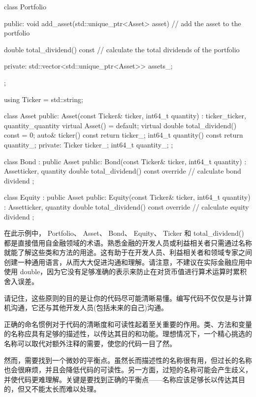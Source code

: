 \begin{cpp}
class Portfolio {
public:
    void add_asset(std::unique_ptr<Asset> asset) {
        // add the asset to the portfolio
    }

    double total_dividend() const {
        // calculate the total dividends of the portfolio
    }

private:
    std::vector<std::unique_ptr<Asset>> assets_;
};

using Ticker = std::string;

class Asset {
public:
    Asset(const Ticker& ticker, int64_t quantity) :
        ticker_{ticker},
        quantity_{quantity} {}
    virtual Asset() = default;
    virtual double total_dividend() const = 0;
    auto& ticker() const { return ticker_; }
    int64_t quantity() const { return quantity_; }
private:
    Ticker ticker_;
    int64_t quantity_;
};

class Bond : public Asset {
public:
    Bond(const Ticker& ticker, int64_t quantity) :
        Asset{ticker, quantity} {}
    double total_dividend() const override {
        // calculate bond dividend
    }
};

class Equity : public Asset {
public:
    Equity(const Ticker& ticker, int64_t quantity) :
        Asset{ticker, quantity} {}
    double total_dividend() const override {
        // calculate equity dividend
    }
};
\end{cpp}

在此示例中， Portfolio、 Asset、 Bond、 Equity、 Ticker 和 total\_dividend() 都是直接借用自金融领域的术语。熟悉金融的开发人员或利益相关者只需通过名称就能了解这些类和方法的用途。这有助于在开发人员、利益相关者和领域专家之间创建一种通用语言，从而大大促进沟通和理解。请注意，不建议在实际金融应用中使用 double，因为它没有足够准确的表示来防止在对货币值进行算术运算时累积舍入误差。

请记住，这些原则的目的是让你的代码尽可能清晰易懂。编写代码不仅仅是与计算机沟通，它还与其他开发人员(包括未来的自己)沟通。


正确的命名惯例对于代码的清晰度和可读性起着至关重要的作用。类、方法和变量的名称应具有足够的描述性，以传达其目的和功能。理想情况下，一个精心挑选的名称可以取代对额外注释的需要，使您的代码一目了然。

然而，需要找到一个微妙的平衡点。虽然长而描述性的名称很有用，但过长的名称也会很麻烦，并且会降低代码的可读性。另一方面，过短的名称可能会产生歧义，并使代码更难理解。关键是要找到正确的平衡点——名称应该足够长以传达其目的，但又不能太长而难以处理。

